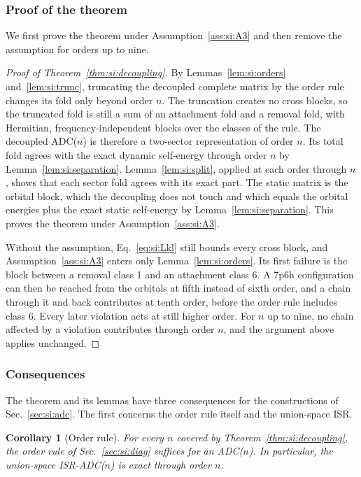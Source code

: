 \documentclass[aip,jcp,reprint,noshowkeys,superscriptaddress]{revtex4-2}
\theoremstyle{plain}
\newtheorem{corollary}{Corollary}
\theoremstyle{definition}
\theoremstyle{remark}
\begin{document}
\subsubsection{Proof of the theorem}

We first prove the theorem under Assumption~\ref{ass:si:A3} and then remove the
assumption for orders up to nine.

\begin{proof}[Proof of Theorem~\ref{thm:si:decoupling}]
By Lemmas~\ref{lem:si:orders} and~\ref{lem:si:trunc}, truncating the decoupled
complete matrix by the order rule changes its fold only beyond order $n$. The
truncation creates no cross blocks, so the truncated fold is still a sum of an
attachment fold and a removal fold, with Hermitian, frequency-independent
blocks over the classes of the rule. The decoupled ADC($n$) is therefore a
two-sector representation of order $n$. Its total fold agrees with the exact
dynamic self-energy through order $n$ by Lemma~\ref{lem:si:separation}.
Lemma~\ref{lem:si:split}, applied at each order through $n$, shows that each
sector fold agrees with its exact part. The static matrix is the orbital block,
which the decoupling does not touch and which equals the orbital energies plus
the exact static self-energy by Lemma~\ref{lem:si:separation}. This proves the
theorem under Assumption~\ref{ass:si:A3}.

Without the assumption, Eq.~\eqref{eq:si:Lkl} still bounds every cross block,
and Assumption~\ref{ass:si:A3} enters only Lemma~\ref{lem:si:orders}. Its first
failure is the block between a removal class 1 and an attachment
class 6. A 7p6h configuration can then be reached from the orbitals at fifth
instead of sixth order, and a chain through it and back contributes at tenth
order, before the order rule includes class 6. Every later violation acts at
still higher order. For $n$ up to nine, no chain affected by a violation
contributes through order $n$, and the argument above applies unchanged.
\end{proof}

\subsubsection{Consequences}

The theorem and its lemmas have three consequences for the constructions of
Sec.~\ref{sec:si:adc}. The first concerns the order rule itself and
the union-space ISR.

\begin{corollary}[Order rule]
\label{cor:si:orderrule}
For every $n$ covered by Theorem~\ref{thm:si:decoupling}, the order rule of
Sec.~\ref{sec:si:diag} suffices for an ADC($n$). In particular, the union-space
ISR-ADC($n$) is exact through order $n$.
\end{corollary}
\end{document}
